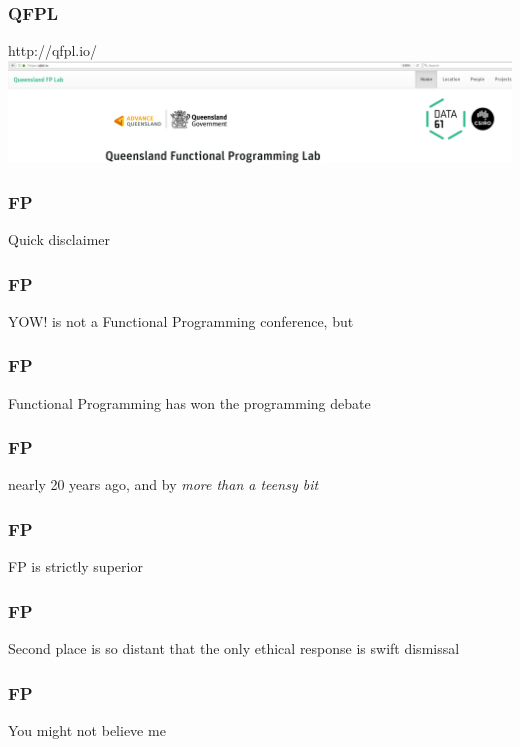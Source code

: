 \begin{frame}
\frametitle{QFPL}
\begin{block}{http://qfpl.io/}
\includegraphics[height=0.24\textheight]{image/qfpl-io.png}
\end{block}
\end{frame}

\begin{frame}
\frametitle{FP}
\begin{center}
Quick disclaimer
\end{center}
\end{frame}

\begin{frame}
\frametitle{FP}
\begin{center}
YOW! is not a Functional Programming conference, but
\end{center}
\end{frame}

\begin{frame}
\frametitle{FP}
\begin{center}
Functional Programming has won the programming debate
\end{center}
\end{frame}

\begin{frame}
\frametitle{FP}
\begin{center}
nearly 20 years ago, and by \emph{more than a teensy bit}
\end{center}
\end{frame}

\begin{frame}
\frametitle{FP}
\begin{center}
FP is strictly superior
\end{center}
\end{frame}

\begin{frame}
\frametitle{FP}
\begin{center}
Second place is so distant that the only ethical response is swift dismissal
\end{center}
\end{frame}

\begin{frame}
\frametitle{FP}
\begin{center}
You might not believe me
\end{center}
\end{frame}

